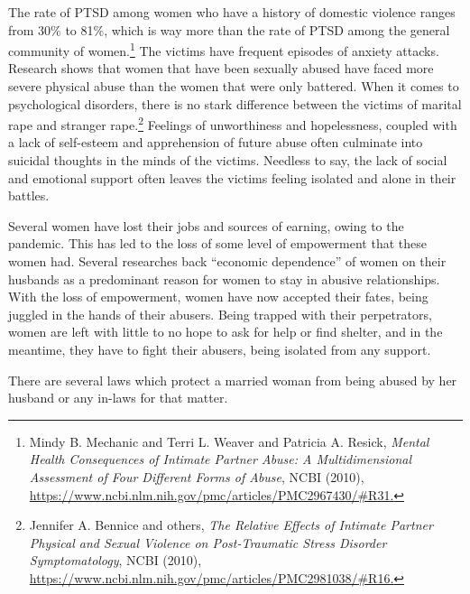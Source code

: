 \begin{multicols}{2}
\noi
The rate of PTSD among women who have a history of domestic violence ranges from 30\%
to 81\%, which is way more than the rate of PTSD among the general community of women.\footnote{Mindy B. Mechanic and Terri L. Weaver and Patricia A. Resick, \textit{Mental Health Consequences of Intimate
Partner Abuse: A Multidimensional Assessment of Four Different Forms of Abuse}, NCBI (2010),
\url{https://www.ncbi.nlm.nih.gov/pmc/articles/PMC2967430/#R31.}}
The victims have frequent episodes of anxiety attacks. Research shows that women that have
been sexually abused have faced more severe physical abuse than the women that were only
battered. When it comes to psychological disorders, there is no stark difference between the
victims of marital rape and stranger rape.\footnote{Jennifer A. Bennice and others, \textit{The Relative Effects of Intimate Partner Physical and Sexual Violence on
Post-Traumatic Stress Disorder Symptomatology}, NCBI (2010),
\url{https://www.ncbi.nlm.nih.gov/pmc/articles/PMC2981038/#R16.}} Feelings of unworthiness and hopelessness,
coupled with a lack of self-esteem and apprehension of future abuse often culminate into
suicidal thoughts in the minds of the victims. Needless to say, the lack of social and
emotional support often leaves the victims feeling isolated and alone in their battles. 

\vspace{-.07cm}

\noi
Several women have lost their jobs and sources of earning, owing to the pandemic. This has
led to the loss of some level of empowerment that these women had. Several researches back
“economic dependence” of women on their husbands as a predominant reason for women to
stay in abusive relationships. With the loss of empowerment, women have now accepted their
fates, being juggled in the hands of their abusers. Being trapped with their perpetrators,
women are left with little to no hope to ask for help or find shelter, and in the meantime, they
have to fight their abusers, being isolated from any support. 

\vspace{-.1cm}


\vspace{-.1cm}

\noi
There are several laws which protect a married woman from being abused by her husband or
any in-laws for that matter.

\vspace{-.15cm}


\end{multicols}
